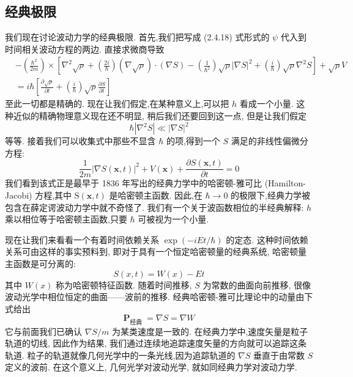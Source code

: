 \subsection{经典极限}
我们现在讨论波动力学的经典极限. 首先,我们把写成 (2.4.18) 式形式的 $\psi$ 代入到时间相关波动方程的两边. 直接求微商导致
\begin{equation}
\begin{aligned}
	&- \left( \frac{{\hbar }^{2}}{2m}\right)\times \left\lbrack {{\nabla }^{2}\sqrt{\rho } + \left( \frac{2i}{\hbar }\right) \left( {\nabla \sqrt{\rho }}\right) \cdot \left( {\nabla S}\right) - \left( \frac{1}{{\hbar }^{2}}\right) \sqrt{\rho }{\left| \nabla S\right| }^{2} + \left( \frac{i}{\hbar }\right) \sqrt{\rho }{\nabla }^{2}S}\right\rbrack + \sqrt{\rho }V\\
	&= i\hbar \left\lbrack {\frac{\partial \sqrt{\rho }}{\partial t} + \left( \frac{i}{\hbar }\right) \sqrt{\rho }\frac{\partial S}{\partial t}}\right\rbrack
\end{aligned}
\end{equation}
至此一切都是精确的. 现在让我们假定,在某种意义上,可以把 $h$ 看成一个小量. 这种近似的精确物理意义现在还不明显, 稍后我们还要回到这一点, 但是让我们假定
\begin{equation}
\hbar \left| {{\nabla }^{2}S}\right| \ll {\left| \nabla S\right| }^{2}
\end{equation}
等等. 接着我们可以收集式中那些不显含 $\hbar$ 的项,得到一个 $S$ 满足的非线性偏微分方程:
\begin{equation}
\frac{1}{2m}{\left| \nabla S\left( \mathbf{x}, t\right) \right| }^{2} + V\left( \mathbf{x}\right) + \frac{\partial S\left( {\mathbf{x}, t}\right) }{\partial t} = 0
\end{equation}
我们看到该式正是最早于 1836 年写出的经典力学中的哈密顿-雅可比 (Hamilton-Jacobi) 方程,其中 $\mathrm{S}\left( {\mathbf{x}, t}\right)$ 是哈密顿主函数. 因此,在 $\hbar \rightarrow 0$ 的极限下,经典力学被包含在薛定谔波动力学中就不奇怪了. 我们有一个关于波函数相位的半经典解释: $h$ 乘以相位等于哈密顿主函数,只要 $\hbar$ 可被视为一个小量.

现在让我们来看看一个有着时间依赖关系 $\exp \left( {-{iEt}/\hbar }\right)$ 的定态. 这种时间依赖关系可由这样的事实预料到, 即对于具有一个恒定哈密顿量的经典系统, 哈密顿量主函数是可分离的:
\begin{equation}
S\left( {x, t}\right) = W\left( x\right) - {Et}
\end{equation}
其中 $W\left( x\right)$ 称为哈密顿特征函数. 随着时间推移, $S$ 为常数的曲面向前推移, 很像波动光学中相位恒定的曲面——波前的推移. 经典哈密顿-雅可比理论中的动量由下式给出
\begin{equation}
{\mathbf{P}}_{\text{经典 }} = \nabla S = \nabla W
\end{equation}
它与前面我们已确认 $\nabla S/m$ 为某类速度是一致的. 在经典力学中,速度矢量是粒子轨道的切线, 因此作为结果, 我们通过连续地追踪速度矢量的方向就可以追踪这条轨道. 粒子的轨道就像几何光学中的一条光线,因为追踪轨道的 $\nabla S$ 垂直于由常数 $S$ 定义的波前. 在这个意义上, 几何光学对波动光学, 就如同经典力学对波动力学.

